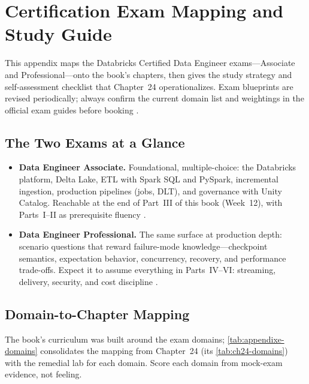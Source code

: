 \chapter{Certification Exam Mapping and Study Guide}
%
This appendix maps the Databricks Certified Data Engineer exams---Associate and
Professional---onto the book's chapters, then gives the study strategy and self-assessment
checklist that Chapter~24 operationalizes. Exam blueprints are revised periodically; always
confirm the current domain list and weightings in the official exam guides before booking
\cite{databricksCertification,databricksAssociateExamGuide,databricksProfessionalExamGuide}.

\section{The Two Exams at a Glance}
%
\begin{itemize}
    \item \textbf{Data Engineer Associate.} Foundational, multiple-choice: the Databricks
    platform, Delta Lake, ETL with Spark SQL and PySpark, incremental ingestion, production
    pipelines (jobs, DLT), and governance with Unity Catalog. Reachable at the end of
    Part~III of this book (Week~12), with Parts~I--II as prerequisite fluency
    \cite{databricksAssociateExamGuide}.
    \item \textbf{Data Engineer Professional.} The same surface at production depth: scenario
    questions that reward failure-mode knowledge---checkpoint semantics, expectation
    behavior, concurrency, recovery, and performance trade-offs. Expect it to assume
    everything in Parts~IV--VI: streaming, delivery, security, and cost discipline
    \cite{databricksProfessionalExamGuide}.
\end{itemize}

\section{Domain-to-Chapter Mapping}
%
The book's curriculum was built around the exam domains; \cref{tab:appendixe-domains}
consolidates the mapping from Chapter~24 (its \cref{tab:ch24-domains}) with the remedial lab
for each domain. Score each domain from mock-exam evidence, not feeling.

